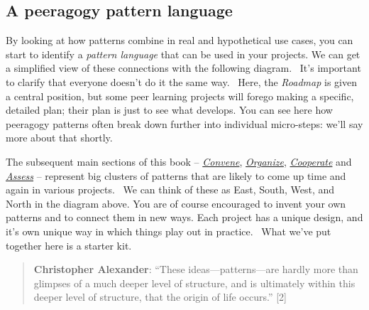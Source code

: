 
\subsection{A peeragogy pattern language}

By looking at how patterns combine in real and hypothetical use cases,
you can start to identify a \emph{pattern language} that can be used in
your projects. We can get a simplified view of these connections with
the following diagram.~ It's important to clarify that everyone doesn't
do it the same way.~ Here, the \emph{Roadmap} is given a central
position, but some peer learning projects will forego making a specific,
detailed plan; their plan is just to see what develops. You can see here
how peeragogy patterns often break down further into individual
micro-steps: we'll say more about that shortly.


The subsequent main sections of this book --
\href{http://peeragogy.org/convene/}{\emph{Convene}},
\href{http://peeragogy.org/organize/}{\emph{Organize}},
\href{http://peeragogy.org/facilitate/}{\emph{Cooperate}} and
\href{http://peeragogy.org/assessment/}{\emph{Assess}} -- represent big
clusters of patterns that are likely to come up time and again in
various projects.~ We can think of these as East, South, West, and North
in the diagram above. You are of course encouraged to invent your own
patterns and to connect them in new ways. Each project has a unique
design, and it's own unique way in which things play out in practice.~
What we've put together here is a starter kit.

\begin{quote}
\textbf{Christopher Alexander}: ``These ideas---patterns---are hardly more
than glimpses of a much deeper level of structure, and is ultimately
within this deeper level of structure, that the origin of life occurs.''
{[}2{]}
\end{quote}

